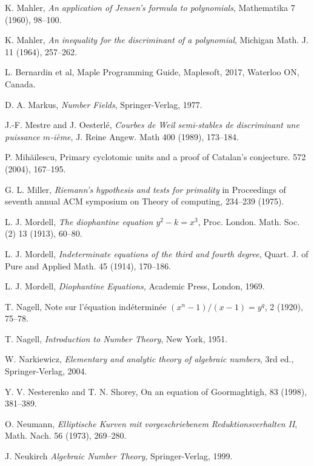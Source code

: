 \begin{thebibliography}{}
K. Mahler,
\emph{An application of Jensen's formula to polynomials},
Mathematika 7 (1960), 98--100.

K. Mahler,
\emph{An inequality for the discriminant of a polynomial},
Michigan Math. J.  11 (1964), 257--262.

L. Bernardin et al, 
\newblock Maple Programming Guide, Maplesoft, 
2017, Waterloo ON, Canada.

D. A. Markus, 
\emph{Number Fields},
Springer-Verlag, 1977.

J.-F. Mestre and J. Oesterl\'e,
\emph{Courbes de Weil semi-stables de discriminant une puissance $m$-i\`eme},
J. Reine Angew. Math 400 (1989), 173--184.

P. Mih{\u{a}}ilescu,
\newblock Primary cyclotomic units and a proof of Catalan's conjecture.
 572  (2004), 167--195.

G. L.  Miller, 
\emph{Riemann's hypothesis and tests for primality} in Proceedings 
of seventh annual ACM symposium on Theory of computing, 234--239 (1975).

L. J. Mordell,
\emph{The diophantine equation $y^2-k=x^3$},
Proc. London. Math. Soc. (2) 13 (1913), 60--80.
  
L. J. Mordell,
\emph{Indeterminate equations of the third and fourth degree},
Quart. J. of Pure and Applied Math. 45 (1914), 170--186.
  
L. J. Mordell,
\emph{Diophantine Equations,}
Academic Press, London,
1969.

T. Nagell, 
\newblock Note sur l'\'equation ind\'etermin\'ee $(x^n-1)/(x-1)=y^q$, 
 2 (1920), 75--78.

T. Nagell, 
\emph{Introduction to Number Theory},
New York, 1951.

W. Narkiewicz, 
\emph{Elementary and analytic theory of algebraic numbers}, 
3rd ed., Springer-Verlag, 2004.

Y. V. Nesterenko and T. N. Shorey,
\newblock On an equation of Goormaghtigh,
 83 (1998), 381--389.

O. Neumann,
\emph{Elliptische Kurven mit vorgeschriebenem Reduktionsverhalten II},
Math. Nach. 56 (1973), 269--280.

J. Neukirch
\emph{Algebraic Number Theory},
Springer-Verlag, 1999.


\end{thebibliography}

